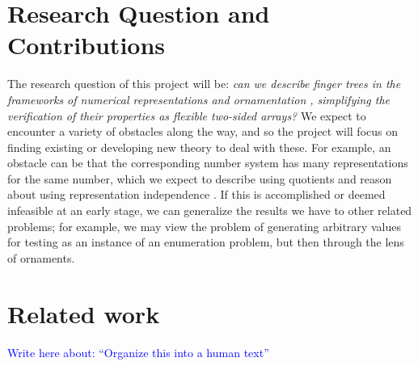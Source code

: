 \documentclass{article}
\theoremstyle{plain}%
\theoremstyle{definition}
\newcommand{\towrite}[1]{\par\textcolor{blue}{Write here about: ``#1''}\par}
\begin{document}
\section{Research Question and Contributions}\label{sec:research-question}
The research question of this project will be: \textit{can we describe finger trees \cite{fingertrees} in the frameworks of numerical representations and ornamentation \cite{progorn}, simplifying the verification of their properties as flexible two-sided arrays?} We expect to encounter a variety of obstacles along the way, and so the project will focus on finding existing or developing new theory to deal with these. For example, an obstacle can be that the corresponding number system has many representations for the same number, which we expect to describe using quotients \cite{cuagda} and reason about using representation independence \cite{iri}. If this is accomplished or deemed infeasible at an early stage, we can generalize the results we have to other related problems; for example, we may view the problem of generating arbitrary values for testing as an instance of an enumeration problem, but then through the lens of ornaments.


\section{Related work}\label{sec:resources}
\towrite{Organize this into a human text}
\end{document}
